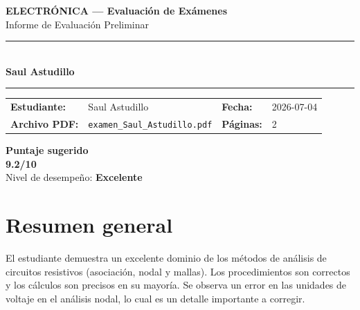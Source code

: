 \documentclass[11pt,a4paper]{article}
\begin{document}
\begin{center}
  {\Large\bfseries\color{azulTitulo} ELECTRÓNICA --- Evaluación de Exámenes}\\[4pt]
  {\large Informe de Evaluación Preliminar}\\[12pt]
  \rule{\linewidth}{1.2pt}\\[6pt]
  {\LARGE\bfseries Saul Astudillo}\\[4pt]
  \rule{\linewidth}{0.6pt}
\end{center}

\vspace{4pt}
\begin{tcolorbox}[cajaTitulo, title=Datos del informe]
\begin{tabular}{@{}llll@{}}
  \textbf{Estudiante:}  & Saul Astudillo  &
  \textbf{Fecha:}       & 2026-07-04 \\[4pt]
  \textbf{Archivo PDF:} & \texttt{examen\_Saul\_Astudillo.pdf}  &
  \textbf{Páginas:}     & 2 \\
\end{tabular}
\end{tcolorbox}

\vspace{6pt}
\begin{center}
  \begin{tcolorbox}[
    enhanced,
    colback=white, colframe=desempeno_excelente,
    width=0.62\linewidth,
    boxrule=2pt,
    halign=center, valign=center,
    top=8pt, bottom=8pt,
  ]
    \centering
    {\large\bfseries Puntaje sugerido}\\[6pt]
    {\Huge\bfseries\color{desempeno_excelente} 9.2/10}\\[6pt]
    {\large Nivel de desempeño: \textbf{\color{desempeno_excelente} Excelente}}
  \end{tcolorbox}
\end{center}

\section*{Resumen general}
El estudiante demuestra un excelente dominio de los métodos de análisis de circuitos resistivos (asociación, nodal y mallas). Los procedimientos son correctos y los cálculos son precisos en su mayoría. Se observa un error en las unidades de voltaje en el análisis nodal, lo cual es un detalle importante a corregir.
\end{document}
